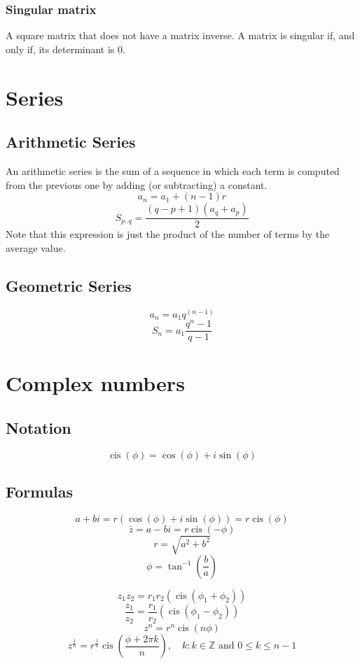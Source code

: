 \documentclass[oneside]{book} %
\theoremstyle{plain}
\DeclareMathOperator\cis{cis} %
\newcommand*\conj[1]{\bar{#1}}
\newcommand*\reciprocal[1]{\frac{1}{#1}}
\newcommand*\argument{\phi}
\newcommand*\integers{\mathbb{Z}}
\begin{document}
\subsection{Singular matrix}
A square matrix that does not have a matrix inverse. A matrix is singular if,
and only if, its determinant is 0.


\chapter{Series}

\section{Arithmetic Series}
An arithmetic series is the sum of a sequence in which each term is computed
from the previous one by adding (or subtracting) a constant.
\[a_n = a_1 + (n-1)r\]
\[S_{p..q} = \frac{(q - p + 1)(a_q + a_p)}{2}\]
Note that this expression is just the product of the number of terms by the
average value.

\section{Geometric Series}
\[a_n = a_1 q^{(n-1)}\]
\[S_n = a_1 \frac{q^n - 1}{q-1}\]

\chapter{Complex numbers}

\section{Notation}
\[\cis \left ( \argument \right ) =  \cos \left ( \argument \right ) + i \sin
\left ( \argument \right )\]

\section{Formulas}
\[a + bi = r \left( \cos \left ( \argument \right ) + i \sin \left ( \argument
\right ) \right )
= r \cis \left ( \argument \right )\]
\[\conj{z} = a - bi = r \cis \left (- \argument \right)\]
\[r = \sqrt{a^2 + b^2}\]
\[\phi = \tan^{-1} \left ( \frac{b}{a} \right)\]

\[z_1 z_2 = r_1 r_2 \left ( \cis \left ( \phi_1 + \phi_2 \right ) \right )\]
\[\frac{z_1}{z_2} = \frac{r_1}{r_2} \left ( \cis \left ( \phi_1 - \phi_2 \right
) \right )\]
\[z^n = r^n \cis \left ( n \argument \right )\]
\[z^{\reciprocal{n}} = r^{\reciprocal{n}} \cis \left ( \frac{\argument + 2 \pi
k}{n} \right ), \quad
k : k \in \integers \text{ and } 0 \le k \le n - 1\]
\end{document}
